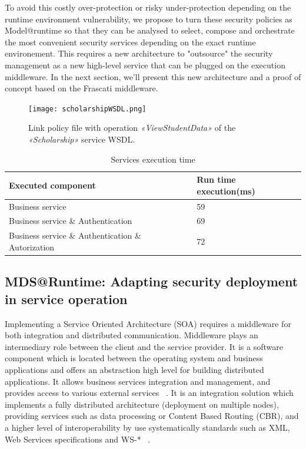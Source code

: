 \documentclass[runningheads,a4paper]{llncs}
\begin{document}
To avoid this costly over-protection or risky under-protection depending on the runtime environment vulnerability, we propose to turn these security policies as Model@runtime so that they can be analysed to select, compose and orchestrate the most convenient security services depending on the exact runtime environement. This requires a new architecture to "outsource" the security management as a new high-level service that can be plugged on the execution middleware. In the next section, we'll present this new architecture and a proof of concept based on the Frascati middleware.
\begin{figure}[ht!]  
\centering
\texttt{[image: scholarshipWSDL.png]}
\caption{Link policy file with operation \emph{«ViewStudentData»} of the \emph{«Scholarship»} service WSDL.}
\label{fig:wsdl}
\end{figure} 
\begin{table}

\caption{Services execution time}
\begin{tabular}{@{}*{2}{|p{5cm}}|}
\hline
Executed component & Run time execution(ms)\\
  \hline
 Business service & 59\\
 Business service \& Authentication & 69\\ 
 Business service \& Authentication \& Autorization & 72\\ 

    \hline
\end{tabular}
\label{tab:tab1}
\end{table}
\subsection{MDS@Runtime: Adapting security deployment in service operation}

Implementing a Service Oriented Architecture (SOA) requires a middleware for both integration and distributed communication. Middleware plays an intermediary role between the client and the service provider. It is a software component which is located between the operating system and business applications and offers an abstraction high level for building distributed applications. It allows business services integration and management, and provides access to various external services ~\cite{SHLP05}. It is an integration solution which implements a fully distributed architecture (deployment on multiple nodes), providing services such as data processing or Content Based Routing (CBR), and a higher level of interoperability by use systematically standards such as XML, Web Services specifications and WS-* ~\cite{Lou08}.
 
\end{document}
